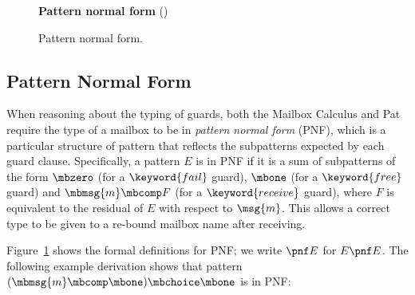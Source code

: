 
\begin{figure}[t]
    {\small
    \textbf{Pattern normal form} () \hfill {}
    \begin{center}
          \begin{prooftree}
          \end{prooftree}
          \qquad
          \begin{prooftree}
          \end{prooftree}
          \qquad
          \begin{prooftree}
          \end{prooftree}
          \qquad
          \begin{prooftree}
          \end{prooftree}
      \end{center}
  }
    \vspace{-1em}

\caption{Pattern normal form.}
\label{fig:pnf}
\end{figure}

\subsection{Pattern Normal Form}
When reasoning about the typing of guards, both the Mailbox Calculus and Pat
require the type of a mailbox to be in \emph{pattern normal form} (PNF), which
is a particular structure of pattern that reflects the subpatterns expected by
each guard clause.
%
Specifically, a pattern $E$ is in PNF if it is a sum of subpatterns of the form
$\mbzero$ (for a
$\keyword{fail}$ guard), $\mbone$ (for a $\keyword{free}$ guard) and $\mbmsg{m}
\mbcomp F$ (for a $\keyword{receive}$ guard), where $F$ is equivalent to the
residual of $E$ with respect to $\msg{m}$. This allows a correct type to be
given to a re-bound mailbox name after receiving.

Figure~\ref{fig:pnf} shows the formal definitions for PNF; we write $\pnf E$ for
$E \pnf E$.
%
The following example derivation shows that
pattern $(\mbmsg{m} \mbcomp \mbone) \mbchoice \mbone$ is in PNF:

